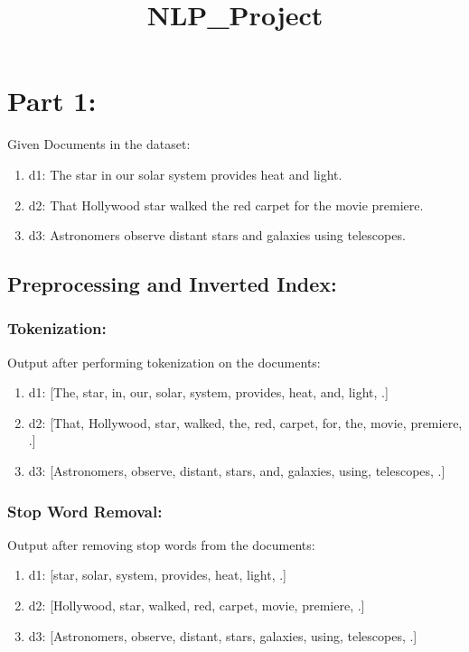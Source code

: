 \documentclass{article}
\title{NLP\_Project}
\author{}
\date{}
\begin{document}
\maketitle

\section{Part 1:}
Given Documents in the dataset:
\begin{enumerate}
    \item d1: The star in our solar system provides heat and light.
    \item d2: That Hollywood star walked the red carpet for the movie premiere.
    \item d3: Astronomers observe distant stars and galaxies using telescopes.
    \end{enumerate}
\subsection{Preprocessing and Inverted Index:}
\subsubsection{Tokenization:}
Output after performing tokenization on the documents:
\begin{enumerate}
    \item d1: [The, star, in, our, solar, system, provides, heat, and, light, .]
    \item d2: [That, Hollywood, star, walked, the, red, carpet, for, the, movie, premiere, .]
    \item d3: [Astronomers, observe, distant, stars, and, galaxies, using, telescopes, .]
\end{enumerate}
\subsubsection{Stop Word Removal:}
Output after removing stop words from the documents:
\begin{enumerate}
    \item d1: [star, solar, system, provides, heat, light, .]
    \item d2: [Hollywood, star, walked, red, carpet, movie, premiere, .]
    \item d3: [Astronomers, observe, distant, stars, galaxies, using, telescopes, .]
\end{enumerate}
\end{document}
